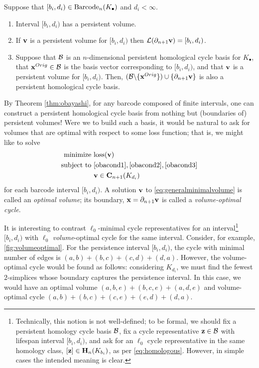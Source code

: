 %
\begin{theorem}  
\label{thm:obayashi}
Suppose that $[b_i, d_i) \in \mathrm{Barcode}_n(K_\bullet)$ and  $d_i < \infty$.
    \begin{enumerate}
        \item Interval $[b_i, d_i)$ has a persistent volume.
        \item If $\mathbf{v}$ is a persistent volume for $[b_i, d_i)$ then $\mathcal{L}(\partial_{n+1}\mathbf{v}) = [b_i, d_i)$.
        \item Suppose that $\mathcal B$ is an $n$-dimensional persistent homological cycle basis for $K_\bullet$, that $\mathbf{x}^{Orig} \in \mathcal B$ is the basis vector corresponding to $[b_i, d_i)$, and that $\mathbf{v}$ is a persistent volume for $[b_i, d_i)$.  Then, $(\mathcal B \backslash \{\mathbf{x}^{Orig}\}) \cup \{\partial_{n+1}\mathbf{v}\} $  
        is also a persistent homological cycle basis.
    \end{enumerate}
\end{theorem}

By Theorem \ref{thm:obayashi}, for any barcode composed of finite intervals, one can construct a persistent homological cycle basis from nothing but (boundaries of) persistent volumes!  Were we to build such a basis, it would be natural to ask for volumes that are optimal with respect to some loss function; that is, we might like to solve
\begin{align}
\begin{split}
    \text{minimize } & \mathrm{loss}(\mathbf{v}) \\
    \text{subject to } 
    & \eqref{obacond1}, \eqref{obacond2}, \eqref{obacond3}\\
    & \textbf{v} \in \mathbf{C}_{n+1}(K_{d_i}) 
\end{split}
\label{eq:generalminimalvolume}
\end{align}
for each barcode interval $[b_i, d_i)$.  A solution $\mathbf{v}$ to \pr \eqref{eq:generalminimalvolume} is called an \emph{optimal volume}; its boundary, $\mathbf{x}=\partial_{n+1}\mathbf{v}$ is called a \emph{volume-optimal cycle}.

It is interesting to contrast $\ell_0$-minimal cycle representatives for an interval\footnote{Technically, this notion is not well-defined; to be formal, we should fix a persistent homology cycle basis $\mathcal B$, fix a cycle representative ${\mathbf z} \in \mathcal B$ with lifespan interval $[b_i, d_i)$, and ask for an $\ell_0$ cycle representative in the same homology class, $[{\mathbf z}] \in \mathbf{H}_n(K_{b_i})$, as per \pr \eqref{eq:homologous}.  However, in simple cases the intended meaning is clear.} $[b_i, d_i)$ with  $\ell_0$ \emph{volume}-optimal cycle for the same interval.  Consider, for example, \fig \ref{fig:volumeoptimal}.  For the persistence interval $[b_i,d_i)$, the cycle with minimal number of edges is $(a,b) + (b,c) + (c,d)  + (d,a)$. However, the volume-optimal cycle would be found as follows: considering $K_{d_i}$, we must find the fewest $2$-simplices whose boundary captures the persistence interval. In this case, we would have an optimal volume  $(a,b,e) + (b,c,e) + (a,d,e)$ and volume-optimal cycle $(a,b)+ (b,c) + (c,e) + (e,d)+ (d,a)$.

